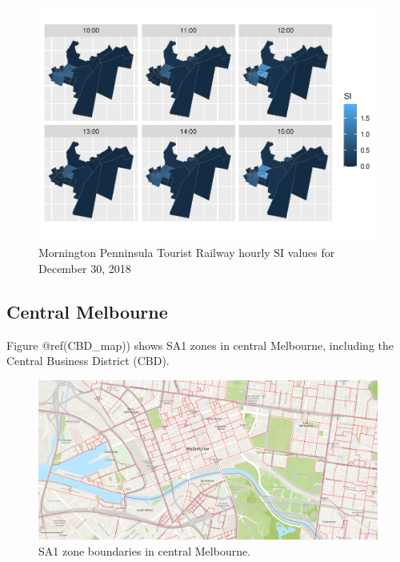 \documentclass[preprint, 3p,
authoryear]{elsarticle} %
\begin{document}
\begin{figure}
\centering
\includegraphics{Leveraging_GTFS_to_assess_transit_supply_Transport_Geography_files/figure-latex/SI_mornington_20181230_output-1.pdf}
\caption{Mornington Penninsula Tourist Railway hourly SI values for
December 30, 2018}
\end{figure}

\hypertarget{central-melbourne}{%
\subsection{Central Melbourne}\label{central-melbourne}}

Figure @ref(CBD\_map)) shows SA1 zones in central Melbourne, including
the Central Business District (CBD).

\begin{figure}
\includegraphics[width=1\linewidth]{graphics/Melbourne_cbd} \caption{SA1 zone boundaries in central Melbourne.}\label{fig:CBD_map}
\end{figure}
\end{document}
